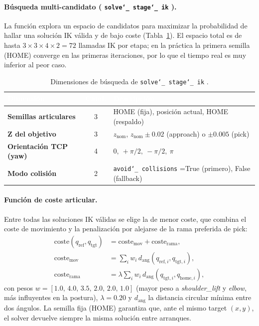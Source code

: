 \documentclass[12pt,a4paper]{article}
\newcommand{\rowA}{\rowcolor{LightGray}}
\newcommand{\rowB}{\rowcolor{white}}
\newcommand{\code}[1]{%
  \begingroup
  \def\_{\char`_\penalty0 }%
  \def\/{\char`/\penalty0 }%
  \texttt{\small #1}%
  \endgroup}
\begin{document}
\paragraph{Búsqueda multi-candidato (\code{solve\_stage\_ik}).}
La función explora un espacio de candidatos para maximizar la probabilidad de hallar una solución IK
válida y de bajo coste (Tabla~\ref{tab:ik-cands}). El espacio total es de hasta
$3\times3\times4\times2=72$ llamadas IK por etapa; en la práctica la primera semilla (HOME) converge en
las primeras iteraciones, por lo que el tiempo real es muy inferior al peor caso.

\begin{table}[H]
\centering
\caption{Dimensiones de búsqueda de \code{solve\_stage\_ik}.}
\label{tab:ik-cands}
\small
\renewcommand{\arraystretch}{1.25}
\begin{tabularx}{\textwidth}{|>{\bfseries}l|c|>{\RaggedRight\arraybackslash}X|}
  \hline
  \rowcolor{BlueHeader}
  \textcolor{white}{\bfseries Dimensión} &
  \textcolor{white}{\bfseries Cand.} &
  \textcolor{white}{\bfseries Descripción} \\
  \hline
  \rowA Semillas articulares & 3 & HOME (fija), posición actual, HOME (respaldo) \\
  \rowB Z del objetivo & 3 & $z_{\text{nom}}$, $z_{\text{nom}}\pm0.02$ (approach) o $\pm0.005$ (pick) \\
  \rowA Orientación TCP (yaw) & 4 & $0,\ +\pi/2,\ -\pi/2,\ \pi$ \\
  \rowB Modo colisión & 2 & \code{avoid\_collisions}=True (primero), False (fallback) \\
  \hline
\end{tabularx}
\end{table}

\paragraph{Función de coste articular.}
Entre todas las soluciones IK válidas se elige la de menor coste, que combina el coste de movimiento y
la penalización por alejarse de la rama preferida de pick:
\begin{align}
\mathrm{coste}(q_{\text{ref}},q_{\text{tgt}}) &= \mathrm{coste}_{\text{mov}} + \mathrm{coste}_{\text{rama}},\\
\mathrm{coste}_{\text{mov}} &= \textstyle\sum_i w_i\, d_{\text{ang}}(q_{\text{ref},i},q_{\text{tgt},i}),\\
\mathrm{coste}_{\text{rama}} &= \lambda \textstyle\sum_i w_i\, d_{\text{ang}}(q_{\text{tgt},i},q_{\text{home},i}),
\end{align}
con pesos $w=[1.0,\,4.0,\,3.5,\,2.0,\,2.0,\,1.0]$ (mayor peso a \textit{shoulder\_lift} y \textit{elbow},
más influyentes en la postura), $\lambda=0.20$ y $d_{\text{ang}}$ la distancia circular mínima entre dos
ángulos. La semilla fija (HOME) garantiza que, ante el mismo target $(x,y)$, el solver devuelve siempre la
misma solución entre arranques.
\end{document}

